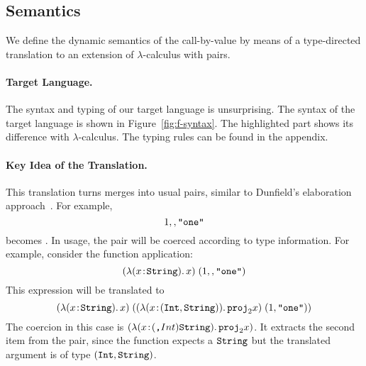 \subsection{Semantics}

We define the dynamic semantics of the call-by-value \name by means of
a type-directed translation to an extension of $\lambda$-calculus with pairs.


\paragraph{Target Language.}
The syntax and typing of our target language is unsurprising. The syntax of the
target language is shown in Figure~\ref{fig:f-syntax}. The highlighted part
shows its difference with $\lambda$-calculus. The typing rules can be found
in the appendix.


\paragraph{Key Idea of the Translation.}
This translation turns merges into usual pairs, similar to Dunfield's
elaboration approach~\cite{dunfield2014elaborating}.
For example, \[ 1 ,, \texttt{"one"} \] becomes 
{}. In usage, the pair will be coerced according to type
information. For example, consider the function application: \[ (\lambda (x \!:\! \texttt{String}).\, x) \; (1 ,, \texttt{"one"}) \] This expression will be translated to \[ (\lambda (x \!:\! \texttt{String}).\, x) \; ((\lambda (x \!:\! (\texttt{Int}, \texttt{String})).\, {\texttt{proj}}_{2} x) \; (1, \texttt{"one"})) \] The coercion in this case is $(\lambda (x \!:\! (\texttt{,} Int) \texttt{String}).\, {\texttt{proj}}_{2} x)$. It extracts the second item from the pair, since
the function expects a $\texttt{String}$ but the translated argument is of type $(\texttt{Int}, \texttt{String})$.


